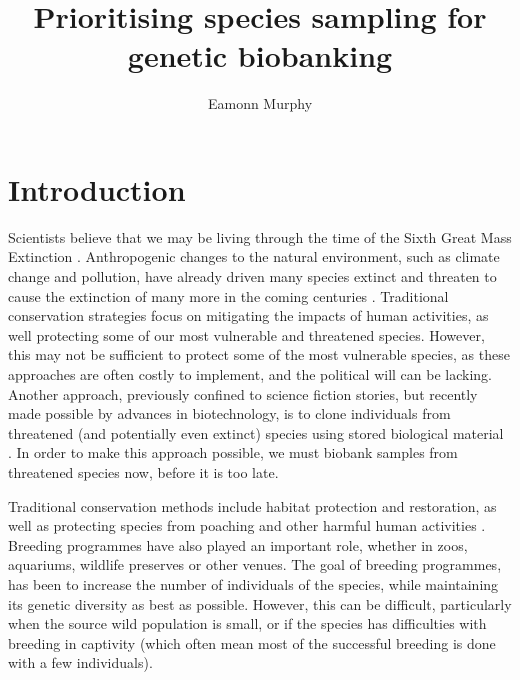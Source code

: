 \documentclass[10pt]{article}
\title{Prioritising species sampling for genetic biobanking}
\author{Eamonn Murphy}
\begin{document}
	\maketitle
	
	\pagebreak
	
	\section{Introduction}

	Scientists believe that we may be living through the time of the Sixth 
	Great Mass Extinction \citep{barnoskyHasEarthSixth2011}. Anthropogenic changes to the natural environment, such 
	as climate change and pollution, have already driven many species extinct and 
	threaten to cause the extinction of many more in the coming centuries \citep{ceballosVertebratesBrinkIndicators2020}. 
	Traditional conservation strategies focus on mitigating the impacts of human
	activities, as well protecting some of our most vulnerable and 
	threatened species. However, this may not be sufficient to protect some of the most
	vulnerable species, as these approaches are often costly to implement, and 
	the political will can be lacking. Another approach, previously confined to
	science fiction stories, but recently made possible by advances in 
	biotechnology, is to clone individuals from threatened (and potentially even
	extinct) species using stored biological material \citep{loiGeneticRescueEndangered2001}. In order to make this approach possible, we must biobank samples from threatened species now, before it is too late.
	
	Traditional conservation methods include habitat
	protection and restoration, as well as protecting species from poaching and other
	harmful human activities \citep{mccarthyFinancialCostsMeeting2012}. Breeding programmes have also played an important role,
	whether in zoos, aquariums, wildlife preserves or other venues. The goal of breeding
	programmes, has been to increase the number of individuals of the species, while
	maintaining its genetic diversity as best as possible. However, this can be 
	difficult, particularly when the source wild population is small, or if the species has
	difficulties with breeding in captivity (which often mean most of the successful
	breeding is done with a few individuals).
	
\end{document}
